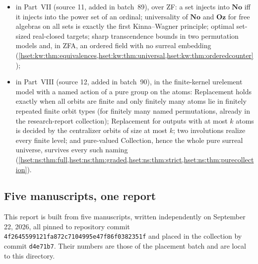 \documentclass[11pt,letterpaper]{article}
\theoremstyle{definition}
\theoremstyle{remark}
\newcommand{\No}{\mathbf{No}}
\newcommand{\repoSHA}{\texttt{4f2645599121fa872c7104995e47f86f0382351f}}
\newcommand{\Oz}{\mathbf{Oz}}
\begin{document}
\begin{itemize}
without Replacement, the equivalence of six definable-family schemes with
ordinal bounding and, over an explicit hierarchy axiom, with full Replacement
and Collection (the weak-base form of \cref{hset:thm:eternity-replacement}); the
exact Collection spectra of kernel urelement models; and a language-sensitive
separation that pure surreal structures cannot see
(\cref{hset:zr:thm:A,hset:zr:thm:B,hset:zr:thm:C});
\item in Part~VII (source 11, added in batch~89), over ZF: a set injects into
$\No$ iff it injects into the power set of an ordinal; universality of $\No$ and
$\Oz$ for free algebras on all sets is exactly the first Kinna--Wagner
principle; optimal set-sized real-closed targets; sharp transcendence bounds in
two permutation models and, in ZFA, an ordered field with no surreal embedding
(\cref{hset:kw:thm:equivalences,hset:kw:thm:universal,hset:kw:thm:orderedcounter});
\item in Part~VIII (source 12, added in batch~90), in the finite-kernel
urelement model with a named action of a pure group on the atoms: Replacement
holds exactly when all orbits are finite and only finitely many atoms lie in
finitely repeated finite orbit types (for finitely many named permutations,
already in the research-report collection); Replacement for outputs with at most
$k$ atoms is decided by the centralizer orbits of size at most $k$; two
involutions realize every finite level; and pure-valued Collection, hence the
whole pure surreal universe, survives every such naming
(\cref{hset:ns:thm:full,hset:ns:thm:graded,hset:ns:thm:strict,hset:ns:thm:purecollection}).\end{itemize}

\subsection{Five manuscripts, one report}
\label{hset:sub:merge}

This report is built from five manuscripts, written independently on
September 22, 2026, all pinned to repository commit \repoSHA{} and placed in
the collection by commit \texttt{d4e71b7}. Their numbers are those of the
placement batch and are local to this directory.
\end{document}
